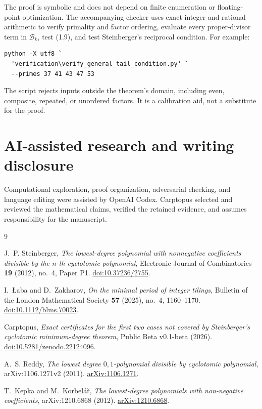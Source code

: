 \documentclass[11pt]{article}
\numberwithin{equation}{section}
\begin{document}
The proof is symbolic and does not depend on finite enumeration or
floating-point optimization. The accompanying checker
{\small{}} uses exact
integer and rational arithmetic to verify primality and factor ordering,
evaluate every proper-divisor term in \(\mathcal B_k\), test (1.9), and test
Steinberger's reciprocal condition. For example:

\begin{Verbatim}[fontsize=\scriptsize]
python -X utf8 `
  'verification\verify_general_tail_condition.py' `
  --primes 37 41 43 47 53
\end{Verbatim}


The script rejects inputs outside the theorem's domain, including even,
composite, repeated, or unordered factors. It is a calibration aid, not a
substitute for the proof.

\section{AI-assisted research and writing disclosure}


Computational exploration, proof organization, adversarial checking, and
language editing were assisted by OpenAI Codex. Carptopus selected and
reviewed the mathematical claims, verified the retained evidence, and
assumes responsibility for the manuscript.

\begin{thebibliography}{9}
\footnotesize
\raggedright

J.~P. Steinberger,
\emph{The lowest-degree polynomial with nonnegative coefficients divisible by
the $n$-th cyclotomic polynomial},
Electronic Journal of Combinatorics \textbf{19} (2012), no.~4, Paper P1.
\href{https://doi.org/10.37236/2755}{doi:10.37236/2755}.

I.~\L aba and D.~Zakharov,
\emph{On the minimal period of integer tilings},
Bulletin of the London Mathematical Society \textbf{57} (2025), no.~4,
1160--1170.
\href{https://doi.org/10.1112/blms.70023}{doi:10.1112/blms.70023}.

Carptopus,
\emph{Exact certificates for the first two cases not covered by Steinberger's
cyclotomic minimum-degree theorem},
Public Beta v0.1-beta (2026).
\href{https://doi.org/10.5281/zenodo.22124096}{doi:10.5281/zenodo.22124096}.

A.~S. Reddy,
\emph{The lowest degree $0,1$-polynomial divisible by cyclotomic polynomial},
arXiv:1106.1271v2 (2011).
\href{https://arxiv.org/abs/1106.1271}{arXiv:1106.1271}.

T.~Kepka and M.~Korbel\'a\v{r},
\emph{The lowest-degree polynomials with non-negative coefficients},
arXiv:1210.6868 (2012).
\href{https://arxiv.org/abs/1210.6868}{arXiv:1210.6868}.

\end{thebibliography}
\end{document}
